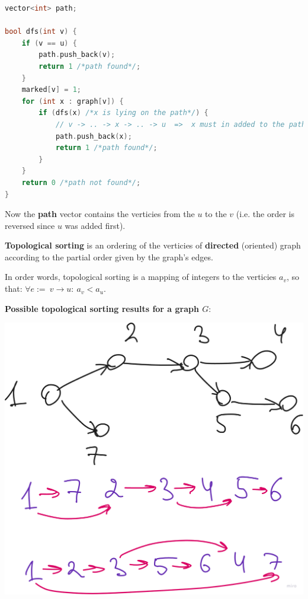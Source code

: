 \begin{lstlisting}[language=C++]
vector<int> path;

bool dfs(int v) {
    if (v == u) {
        path.push_back(v);
        return 1 /*path found*/;
    }
    marked[v] = 1;
    for (int x : graph[v]) {
        if (dfs(x) /*x is lying on the path*/) {
            // v -> .. -> x -> .. -> u  =>  x must in added to the path
            path.push_back(x);
            return 1 /*path found*/;
        }
    }
    return 0 /*path not found*/;
}
\end{lstlisting}

Now the \textbf{path} vector contains the verticies from the $u$ to the $v$ (i.e. the order is reversed since $u$ was added first).



\begin{definition}
    \textbf{Topological sorting} is an ordering of the verticies of \textbf{directed} (oriented) graph according to the partial order given by the graph's edges.

    In order words, topological sorting is a mapping of integers to the verticies $a_v$, so that: $\forall e := \ v \to u: \ a_v < a_u$.
\end{definition}

\begin{example}

    \textbf{Possible topological sorting results for a graph $G$}:

    \begin{center}
        \includegraphics[scale=0.2]{./assets/14-graphs-and-basic-dfs/3.png}
    \end{center}

\end{example}

